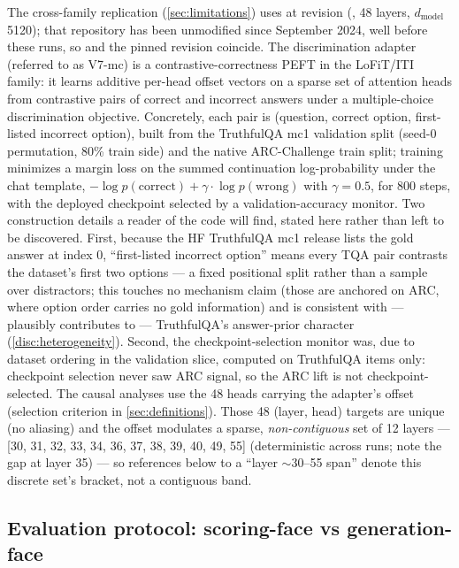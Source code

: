 The cross-family replication
(\cref{sec:limitations}) uses 
at revision 
(, 48 layers, $d_{\mathrm{model}}$ 5120); that repository has
been unmodified since September 2024, well before these runs, so  and the
pinned revision coincide. The discrimination
adapter (referred to as V7-mc) is a contrastive-correctness PEFT in the LoFiT/ITI
family: it learns
additive per-head offset vectors on a sparse set of attention heads from contrastive
pairs of correct and incorrect answers under a multiple-choice discrimination
objective. Concretely, each pair is (question, correct option, first-listed
incorrect option), built from the TruthfulQA mc1 validation split (seed-0
permutation, 80\% train side) and the native ARC-Challenge train split; training
minimizes a margin loss on the summed continuation log-probability under the chat
template, $-\log p(\mathrm{correct}) + \gamma\cdot\log p(\mathrm{wrong})$ with
$\gamma = 0.5$, for 800 steps, with the deployed checkpoint selected by a
validation-accuracy monitor. Two construction details a reader of the code will
find, stated here rather than left to be discovered. First, because the HF
TruthfulQA mc1 release lists the gold answer at index 0, ``first-listed incorrect
option'' means every TQA pair contrasts the dataset's first two options --- a fixed
positional split rather than a sample over distractors; this touches no mechanism
claim (those are anchored on ARC, where option order carries no gold information)
and is consistent with --- plausibly contributes to --- TruthfulQA's answer-prior
character (\cref{disc:heterogeneity}). Second, the checkpoint-selection monitor was,
due to dataset ordering in the validation slice, computed on TruthfulQA items only:
checkpoint selection never saw ARC signal, so the ARC lift is not
checkpoint-selected. The causal analyses use the 48 heads carrying the adapter's
offset (selection criterion in \cref{sec:definitions}). Those 48 (layer, head)
targets are unique (no aliasing) and the offset modulates a sparse,
\emph{non-contiguous} set of 12 layers --- [30, 31, 32, 33, 34, 36, 37, 38, 39, 40,
49, 55] (deterministic across runs; note the gap at layer 35) --- so references
below to a ``layer ${\sim}$30--55 span'' denote this discrete set's bracket, not a
contiguous band.

\subsection{Evaluation protocol: scoring-face vs generation-face}
\label{method:protocol}

